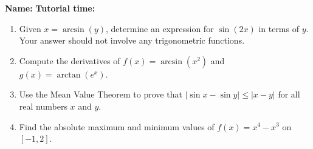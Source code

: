 \documentclass[12pt]{article}
\newcommand{\abs}[1]{\lvert #1\rvert}
\begin{document}
{\bf \large Name:} \hspace{2.5in} {\bf Tutorial time:}

\bigskip

\bigskip

\thispagestyle{fancy}

 \begin{enumerate}
 \item  Given $x=\arcsin(y)$, determine an expression for $\sin(2x)$ in terms of $y$. Your answer should not involve any trigonometric functions.

\vspace{3.5in}

 

 \item  Compute the derivatives of $f(x) = \arcsin(x^2)$ and $g(x) = \arctan(e^x)$.

\newpage



 \item Use the Mean Value Theorem to prove that $\abs{\sin x - \sin y}\leq \abs{x-y}$ for all real numbers $x$ and $y$.

\vspace{3.5in}

 \item Find the absolute maximum and minimum values of $f(x)=x^4-x^3$ on $[-1,2]$.
\end{enumerate}
\end{document}
